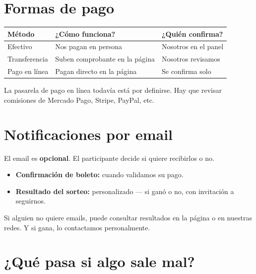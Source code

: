 \documentclass[12pt,a4paper]{article}
\begin{document}
\section{Formas de pago}

\begin{table}[H]
\centering
\begin{tabularx}{\textwidth}{lXl}
\toprule
\textbf{Método} & \textbf{¿Cómo funciona?} & \textbf{¿Quién confirma?} \\
\midrule
Efectivo & Nos pagan en persona & Nosotros en el panel \\
Transferencia & Suben comprobante en la página & Nosotros revisamos \\
Pago en línea & Pagan directo en la página & Se confirma solo \\
\bottomrule
\end{tabularx}
\end{table}

La pasarela de pago en línea todavía está por definirse. Hay que revisar comisiones de Mercado Pago, Stripe, PayPal, etc.

\section{Notificaciones por email}

El email es \textbf{opcional}. El participante decide si quiere recibirlos o no.

\begin{itemize}[leftmargin=2em]
    \item \textbf{Confirmación de boleto:} cuando validamos su pago.
    \item \textbf{Resultado del sorteo:} personalizado --- si ganó o no, con invitación a seguirnos.
\end{itemize}

Si alguien no quiere emails, puede consultar resultados en la página o en nuestras redes. Y si gana, lo contactamos personalmente.

\section{¿Qué pasa si algo sale mal?}
\end{document}
